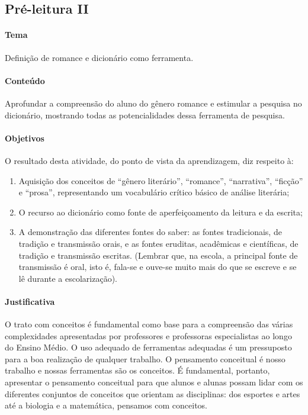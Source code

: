 \documentclass[12pt]{extarticle}
\begin{document}
{\subsection{Pré-leitura II}


\paragraph{Tema} Definição de romance e dicionário como ferramenta.


\paragraph{Conteúdo} Aprofundar a compreensão do aluno do gênero romance e estimular a pesquisa no dicionário, mostrando todas as potencialidades dessa ferramenta de pesquisa.


\paragraph{Objetivos}
O resultado desta atividade, do ponto de vista da aprendizagem, diz
respeito à:

\begin{enumerate} 
\item
Aquisição dos conceitos de ``gênero literário'',
``romance'', ``narrativa'', ``ficção'' e ``prosa'', representando um
vocabulário crítico básico de análise literária; 

\item
O recurso ao dicionário como fonte de aperfeiçoamento da leitura e da escrita;

\item
A demonstração das diferentes fontes do saber: as fontes tradicionais, de
tradição e transmissão orais, e as fontes eruditas, acadêmicas e
científicas, de tradição e transmissão escritas. (Lembrar que, na
escola, a principal fonte de transmissão é oral, isto é, fala-se e
ouve-se muito mais do que se escreve e se lê durante a escolarização).
\end{enumerate}

\paragraph{Justificativa}

O trato com conceitos é fundamental como base para a compreensão das
várias complexidades apresentadas por professores e professoras
especialistas ao longo do Ensino Médio. O uso adequado de ferramentas
adequadas é um pressuposto para a boa realização de qualquer trabalho. O
pensamento conceitual é nosso trabalho e nossas ferramentas são os
conceitos. É fundamental, portanto, apresentar o pensamento conceitual
para que alunos e alunas possam lidar com os diferentes conjuntos de
conceitos que orientam as disciplinas: dos esportes e artes até a
biologia e a matemática, pensamos com conceitos.

}
\end{document}
